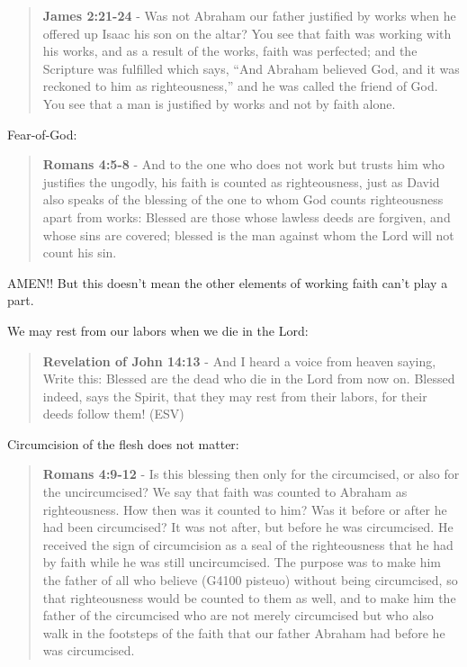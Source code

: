 \documentclass[11pt]{article}
\begin{document}
\begin{quote}
\textbf{James 2:21-24} - Was not Abraham our father justified by works when he offered up Isaac his son on the altar? You see that faith was working with his works, and as a result of the works, faith was perfected; and the Scripture was fulfilled which says, “And Abraham believed God, and it was reckoned to him as righteousness,” and he was called the friend of God. You see that a man is justified by works and not by faith alone.
\end{quote}

Fear-of-God:

\begin{quote}
\textbf{Romans 4:5-8} - And to the one who does not work but trusts him who justifies the ungodly, his faith is counted as righteousness, just as David also speaks of the blessing of the one to whom God counts righteousness apart from works: Blessed are those whose lawless deeds are forgiven, and whose sins are covered; blessed is the man against whom the Lord will not count his sin.
\end{quote}

AMEN!! But this doesn't mean the other elements of working faith can't play a part.

We may rest from our labors when we die in the Lord:

\begin{quote}
\textbf{Revelation of John 14:13} - And I heard a voice from heaven saying, Write this: Blessed are the dead who die in the Lord from now on. Blessed indeed, says the Spirit, that they may rest from their labors, for their deeds follow them! (ESV)
\end{quote}

Circumcision of the flesh does not matter:

\begin{quote}
\textbf{Romans 4:9-12} - Is this blessing then only for the circumcised, or also for the uncircumcised? We say that faith was counted to Abraham as righteousness. How then was it counted to him? Was it before or after he had been circumcised? It was not after, but before he was circumcised. He received the sign of circumcision as a seal of the righteousness that he had by faith while he was still uncircumcised. The purpose was to make him the father of all who believe (G4100 pisteuo) without being circumcised, so that righteousness would be counted to them as well, and to make him the father of the circumcised who are not merely circumcised but who also walk in the footsteps of the faith that our father Abraham had before he was circumcised.
\end{quote}
\end{document}
